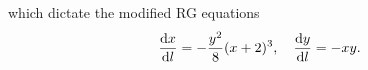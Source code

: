 which dictate the modified RG equations
\begin{align}
    \frac{\mathrm d x}{\mathrm d l} = -\frac{y^2}8(x+2)^3,
    \quad
    \frac{\mathrm d y}{\mathrm d l} = - xy.
\end{align}
\begin{figure}
    \centering

\end{figure}
